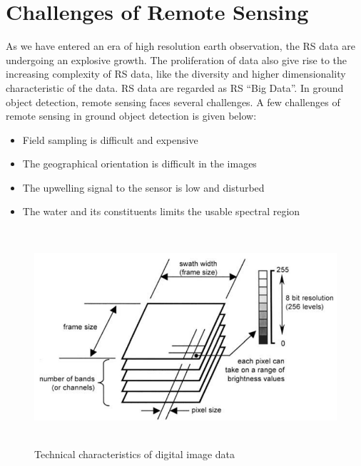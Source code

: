 \documentclass[document.tex]{subfiles}
\begin{document}
\section{Challenges of Remote Sensing}
\noindent As we have entered an era of high resolution earth observation, the RS data are undergoing an explosive growth. The proliferation of data also give rise to the increasing complexity of RS data, like the diversity and higher dimensionality characteristic of the data. RS data are regarded as RS “Big Data”. In ground object detection, remote sensing faces several challenges. A few challenges of remote sensing in ground object detection is given below:
\begin{itemize}
	\item Field sampling is difficult and expensive
	\item The geographical orientation is difficult in the images
	\item The upwelling signal to the sensor is low and disturbed
	\item The water and its constituents limits the usable spectral region
\end{itemize}

\begin{figure}[H]
	\begin{center}
		\includegraphics[height=8.0cm]{imgs/capture.png}
	\end{center}
	\caption{Technical characteristics of
		digital image data\cite{3}}
	\label{fig: Technical characteristics of
		digital image data}
\end{figure}
\end{document}
